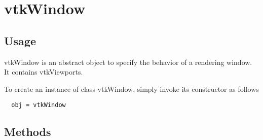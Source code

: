 \section{vtkWindow}

\subsection{Usage}

 vtkWindow is an abstract object to specify the behavior of a
 rendering window.  It contains vtkViewports.

To create an instance of class vtkWindow, simply
invoke its constructor as follows
\begin{verbatim}
  obj = vtkWindow
\end{verbatim}
\subsection{Methods}

